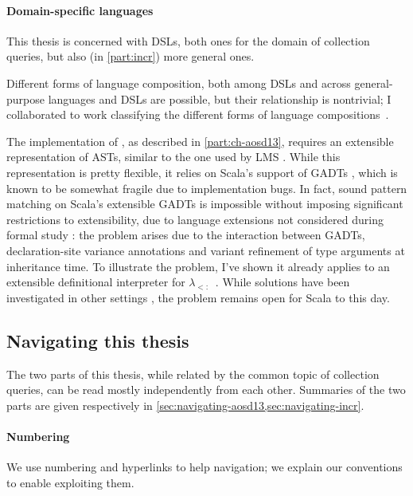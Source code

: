 \paragraph{Domain-specific languages}
This thesis is concerned with DSLs, both ones for the domain of collection
queries, but also (in \cref{part:incr}) more general ones.

Different forms of language composition, both among DSLs and across
general-purpose languages and DSLs are possible, but their relationship is
nontrivial; I collaborated to work classifying the different forms of language
compositions~\citep*{ErdwegGR12}.

The implementation of \LoS, as described in \cref{part:ch-aosd13}, requires an
extensible representation of ASTs, similar to the one used by LMS
\citep{rompf2010lightweight}. While this representation is pretty flexible, it
relies on Scala's support of GADTs \citep{Emir06Variance,Emir07Patterns}, which
is known to be somewhat fragile due to implementation bugs. In fact,
sound pattern matching on Scala's extensible GADTs is impossible
without imposing significant restrictions to extensibility, due to language
extensions not considered during formal study
\citep{Emir06Variance,Emir07Correct}: the problem arises due to the interaction
between GADTs, declaration-site variance annotations and variant refinement of
type arguments at inheritance time.
To illustrate the problem, I've shown it already applies to an extensible
definitional interpreter for $\lambda_{<:}$~\citep{Giarrusso2013gadt}.
While solutions have been investigated in other settings
\citep{Scherer13GADTSub}, the problem remains open for Scala to this day.


\subsection{Navigating this thesis}
The two parts of this thesis, while related by the common topic of collection
queries, can be read mostly independently from each other.
Summaries of the two parts are given respectively in
\cref{sec:navigating-aosd13,sec:navigating-incr}.


\paragraph{Numbering}
We use numbering and hyperlinks to help navigation; we explain our conventions
to enable exploiting them.

